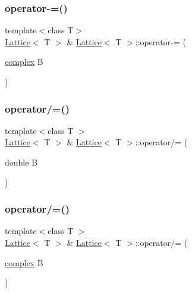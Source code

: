 \mbox{\label{class_lattice_a848d049b47fe69fc99fd54d8a39b544f}} 
\subsubsection{\texorpdfstring{operator-\/=()}{operator-=()}\hspace{0.1cm}{\footnotesize\ttfamily [3/3]}}
{\footnotesize\ttfamily template$<$class T$>$ \\
\mbox{\hyperlink{class_lattice}{Lattice}}$<$ T $>$ \& \mbox{\hyperlink{class_lattice}{Lattice}}$<$ T $>$\+::operator-\/= (\begin{DoxyParamCaption}\item[{\mbox{\hyperlink{classcomplex}{complex}}}]{B }\end{DoxyParamCaption})\hspace{0.3cm}{\ttfamily [inline]}}

\mbox{\label{class_lattice_aafe786fd40986031094f2d76ca28640b}} 
\subsubsection{\texorpdfstring{operator/=()}{operator/=()}\hspace{0.1cm}{\footnotesize\ttfamily [1/2]}}
{\footnotesize\ttfamily template$<$class T $>$ \\
\mbox{\hyperlink{class_lattice}{Lattice}}$<$ T $>$ \& \mbox{\hyperlink{class_lattice}{Lattice}}$<$ T $>$\+::operator/= (\begin{DoxyParamCaption}\item[{double}]{B }\end{DoxyParamCaption})\hspace{0.3cm}{\ttfamily [inline]}}

\mbox{\label{class_lattice_afa9568877b23d2266c7d2f29fe0ec6ad}} 
\subsubsection{\texorpdfstring{operator/=()}{operator/=()}\hspace{0.1cm}{\footnotesize\ttfamily [2/2]}}
{\footnotesize\ttfamily template$<$class T $>$ \\
\mbox{\hyperlink{class_lattice}{Lattice}}$<$ T $>$ \& \mbox{\hyperlink{class_lattice}{Lattice}}$<$ T $>$\+::operator/= (\begin{DoxyParamCaption}\item[{\mbox{\hyperlink{classcomplex}{complex}}}]{B }\end{DoxyParamCaption})\hspace{0.3cm}{\ttfamily [inline]}}

